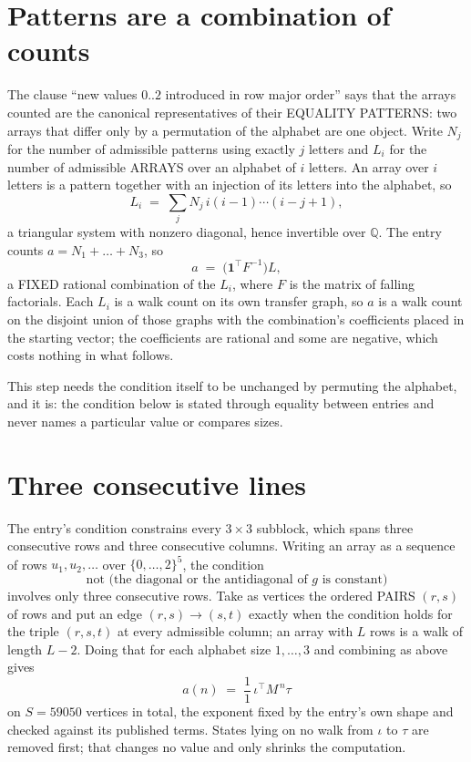 \documentclass[11pt,a4paper]{article}
\theoremstyle{plain}
\theoremstyle{definition}
\begin{document}
\section{Patterns are a combination of counts}

The clause ``new values $0..2$ introduced in row major order'' says that the arrays
counted are the canonical representatives of their EQUALITY PATTERNS: two arrays that differ
only by a permutation of the alphabet are one object. Write $N_j$ for the number of admissible
patterns using exactly $j$ letters and $L_i$ for the number of admissible ARRAYS over an
alphabet of $i$ letters. An array over $i$ letters is a pattern together with an injection of
its letters into the alphabet, so
\[
L_i\;=\;\sum_{j}N_j\,i(i-1)\cdots(i-j+1),
\]
a triangular system with nonzero diagonal, hence invertible over $\mathbb{Q}$. The entry
counts $a=N_1+\dots+N_{3}$, so
\[
a\;=\;\bigl(\mathbf{1}^{\!\top}F^{-1}\bigr)L ,
\]
a FIXED rational combination of the $L_i$, where $F$ is the matrix of falling factorials.
Each $L_i$ is a walk count on its own transfer graph, so $a$ is a walk count on the disjoint
union of those graphs with the combination's coefficients placed in the starting vector; the
coefficients are rational and some are negative, which costs nothing in what follows.

This step needs the condition itself to be unchanged by permuting the alphabet, and it is:
the condition below is stated through equality between entries and never names a particular
value or compares sizes.

\section{Three consecutive lines}

The entry's condition constrains every $3\times3$ subblock, which spans three consecutive
rows and three consecutive columns. Writing an array as a sequence of rows
$u_1,u_2,\dots$ over $\{0,\dots,2\}^{5}$, the condition
\[
\text{not }\bigl(\text{the diagonal or the antidiagonal of }g\text{ is constant}\bigr)
\]
involves only three consecutive rows. Take as vertices the ordered PAIRS $(r,s)$ of
rows and put an edge $(r,s)\to(s,t)$ exactly when the condition holds for the triple
$(r,s,t)$ at every admissible column; an array with $L$ rows is a walk of length $L-2$.
Doing that for each alphabet size $1,\dots,3$ and combining as above gives
\[
a(n)\;=\;\frac{1}{1}\,\iota^{\!\top}M^{\,n}\tau
\]
on $S=59050$ vertices in total, the exponent fixed by the entry's own shape and checked against
its published terms. States lying on no walk from $\iota$ to $\tau$ are removed first; that
changes no value and only shrinks the computation.
\end{document}
